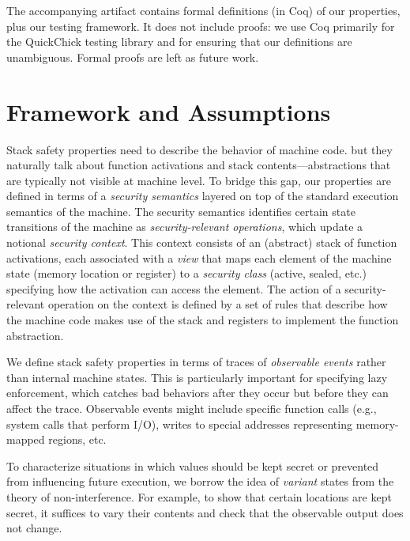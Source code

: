 \documentclass[10pt,conference]{ieeetran}%
\theoremstyle{definition}
\begin{document}
The accompanying artifact contains formal definitions (in Coq) of our
properties, plus our testing framework.  It does not include proofs:
we use Coq primarily for the QuickChick testing library and for
ensuring that our definitions are unambiguous.  Formal proofs are left
as future work.



\section{Framework and Assumptions}
\label{sec:ideas}

Stack safety properties need to describe the behavior of machine code. but they naturally
talk about function activations and stack contents---abstractions that
are typically not visible at machine level. To bridge this gap,
our properties are defined in terms of a {\em security semantics} layered on top of
the standard execution semantics of the machine.  The security semantics identifies certain
state transitions of the machine as {\em security-relevant
  operations}, which update
a notional {\em security context}.  This context consists of
an (abstract) stack of function activations, each associated with a {\em view}
that maps each element of the machine state (memory location or register)
to a {\em security class} (active, sealed, etc.) specifying how the activation
can access the element.
The action of a security-relevant operation on the context is defined by a set
of rules that describe how the machine code makes use of the stack and registers
to implement the function abstraction.

We define stack safety properties in
terms of traces of {\em observable events} rather than internal machine states.
This is particularly important for
specifying lazy enforcement, which catches bad behaviors after they occur but
before they can affect the trace.
Observable events might include specific function calls (e.g., system
calls that perform I/O), writes to special addresses representing
memory-mapped regions, etc.

To characterize situations in which values should be kept secret or prevented
from influencing future execution, we borrow the idea of \emph{variant} states
from the theory of non-interference.  For example, to show that certain locations
are kept secret, it suffices to vary their contents and check that the observable
output does not change.
\end{document}
